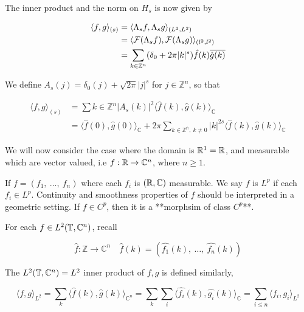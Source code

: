 \documentclass[../main-manifolds.tex]{subfiles}
\begin{document}
The inner product and the norm on $H_s$ is now given by


\begin{align}
\langle f,g\rangle_{(s)} &= \langle \Lambda_s f,\Lambda_s g\rangle_{(L^2,L^2)} \\
&=\langle \mathcal{F}(\Lambda_s f),\mathcal{F}(\Lambda_s g)\rangle_{(l^2,l^2)}\\
&= \sum_{k\in\mathbb{Z}^n}(\delta_0 + 2\pi \vert k\vert^s)\hat{f}(k)\overline{\hat{g}(k)}\\
\end{align}


We define $A_s(j) = \delta_0(j) + \sqrt{2\pi}\vert j\vert^s$ for $j\in\mathbb{Z}^n$, so that 


\begin{align}
\langle f,g\rangle_{(s)} &= \sum{k\in\mathbb{Z}^n} \vert A_s(k)\vert^2 \langle \hat{f}(k),\hat{g}(k)\rangle_{\mathbb{C}}\\
&= \langle \hat{f}(0),\hat{g}(0)\rangle_{\mathbb{C}} + 2\pi\sum_{k\in\mathbb{Z^n},\: k\neq 0}\vert k\vert^{2s}\langle \hat{f}(k),\hat{g}(k)\rangle_{\mathbb{C}}
\end{align}


We will now consider the case where the domain is $\mathbb{R}^1 = \mathbb{R}$, and measurable which are vector valued, i.e $f: \mathbb{R}\to \mathbb{C}^n$, where $n\geq 1$.

If $f = (f_1,\: \ldots, \: f_n)$ where each $f_i$ is $(\mathbb{R},\mathbb{C})$ measurable. We say $f$ is $L^p$ if each $f_i\in L^p$. Continuity and smoothness properties of $f$ should be interpreted in a geometric setting. If $f\in C^p$, then it is a **morphsim of class $C^p$**.

For each $f\in L^2(\mathbb{T}, \mathbb{C}^n)$, recall

$$
\hat{f}:\mathbb{Z}\to\mathbb{C}^n\quad \hat{f}(k) = (\hat{f_1}(k),\:\ldots,\:\hat{f_n}(k))
$$

The $L^2(\mathbb{T},\mathbb{C}^n)=L^2$ inner product of $f,g$ is defined similarly,

$$
\langle f,g\rangle_{L^2} = \sum_k \langle \hat{f}(k),\hat{g}(k)\rangle_{\mathbb{C}^n} =\sum_k\sum_i\langle\hat{f_i}(k),\hat{g_i} (k)\rangle_{\mathbb{C}} =\sum_{i\leq n}\langle f_i,g_i\rangle_{L^2}
$$
\end{document}
